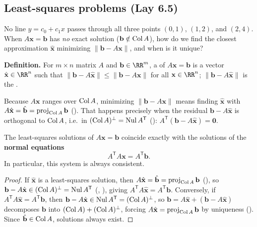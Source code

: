 \documentclass[10pt]{scrartcl}
\newcommand{\vv}[1]{\mathbf{#1}}
\begin{document}
\subsection{Least-squares problems (Lay 6.5)}

\begin{qbox}
  No line $y=c_0+c_1x$ passes through all three points $(0,1)$, $(1,2)$, and $(2,4)$. When $A\vv x=\vv b$ has \emph{no} exact solution ($\vv b\notin\Col A$), how do we find the closest approximation $\hat{\vv x}$ minimizing $\| \vv b - A\vv x \|$, and when is it unique?
\end{qbox}

\noindent\textbf{Definition.} For $m\times n$ matrix $A$ and $\vv b\in\RR^m$, a  of $A\vv x=\vv b$ is a vector $\hat{\vv x}\in\RR^n$ such that $\|\vv b-A\hat{\vv x}\| \le \|\vv b-A\vv x\|$ for all $\vv x\in\RR^n$; $\|\vv b-A\hat{\vv x}\|$ is the .

Because $A\vv x$ ranges over $\operatorname{Col} A$, minimizing $\|\vv b-A\vv x\|$ means finding $\hat{\vv x}$ with $A\hat{\vv x}=\hat{\vv b}=\proj_{\Col A}\vv b$ (). That happens precisely when the residual $\vv b-A\hat{\vv x}$ is orthogonal to $\operatorname{Col} A$, i.e.\ in $(\operatorname{Col} A)^\perp=\operatorname{Nul} A^{\mathsf T}$ (): $A^{\mathsf T}(\vv b-A\hat{\vv x})=\vv 0$.

\begin{theorem*}
  The least-squares solutions of $A\vv x=\vv b$ coincide exactly with the solutions of the \textbf{normal equations}
  \[
    A^{\mathsf T}A\vv x = A^{\mathsf T}\vv b.
  \]
  In particular, this system is always consistent.
\end{theorem*}
\begin{proof}
  If $\hat{\vv x}$ is a least-squares solution, then $A\hat{\vv x}=\hat{\vv b}=\proj_{\Col A}\vv b$ (), so $\vv b-A\hat{\vv x}\in(\Col A)^\perp=\Nul A^{\mathsf T}$ (, ), giving $A^{\mathsf T}A\hat{\vv x}=A^{\mathsf T}\vv b$. Conversely, if $A^{\mathsf T}A\hat{\vv x}=A^{\mathsf T}\vv b$, then $\vv b-A\hat{\vv x}\in\Nul A^{\mathsf T}=(\Col A)^\perp$, so $\vv b=A\hat{\vv x}+(\vv b-A\hat{\vv x})$ decomposes $\vv b$ into $(\operatorname{Col} A)+(\operatorname{Col} A)^\perp$, forcing $A\hat{\vv x}=\proj_{\Col A}\vv b$ by uniqueness (). Since $\hat{\vv b}\in\Col A$, solutions always exist.
\end{proof}
\end{document}
